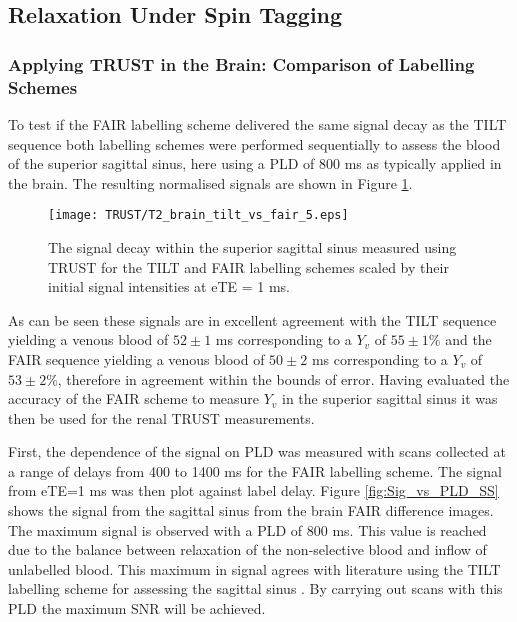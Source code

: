 \subsection{\ttwo Relaxation Under Spin Tagging}
\subsubsection{Applying \ac{TRUST} in the Brain: Comparison of Labelling Schemes}

To test if the \ac{FAIR} labelling scheme delivered the same signal decay as the \ac{TILT} sequence both labelling schemes were performed sequentially to assess the blood \ttwo of the superior sagittal sinus, here using a \ac{PLD} of 800 ms as typically applied in the brain. The resulting normalised signals are shown in Figure \ref{fig:TILT_vs_FAIR}.
\begin{figure}[H]
	\centering
	\texttt{[image: TRUST/T2\_brain\_tilt\_vs\_fair\_5.eps]}
	\caption{The signal decay within the superior sagittal sinus measured using \ac{TRUST} for the \ac{TILT} and \ac{FAIR} labelling schemes scaled by their initial signal intensities at eTE = 1 ms.}
	\label{fig:TILT_vs_FAIR}	
\end{figure}

As can be seen these signals are in excellent agreement with the \ac{TILT} sequence yielding a venous blood \ttwo of $52\pm1$ ms corresponding to a $Y_v$ of $55\pm1\%$ and the \ac{FAIR} sequence yielding a venous blood \ttwo of $50\pm2$ ms corresponding to a $Y_v$ of $53\pm2\%$, therefore in agreement within the bounds of error. Having evaluated the accuracy of the \ac{FAIR} scheme to measure $Y_v$ in the superior sagittal sinus it was then be used for the renal \ac{TRUST} measurements.

First, the dependence of the signal on \ac{PLD} was measured with scans collected at a range of delays from 400 to 1400 ms for the \ac{FAIR} labelling scheme. The signal from \ac{eTE}=1 ms was then plot against label delay. Figure \ref{fig:Sig_vs_PLD_SS} shows the signal from the sagittal sinus from the brain \ac{FAIR} difference images. The maximum signal is observed with a \ac{PLD} of 800 ms. This value is reached due to the balance between \tone relaxation of the non-selective blood and inflow of unlabelled blood. This maximum in signal agrees with literature using the \ac{TILT} labelling scheme for assessing the sagittal sinus \cite{lu_quantitative_2008}. By carrying out scans with this \ac{PLD} the maximum \ac{SNR} will be achieved. 

